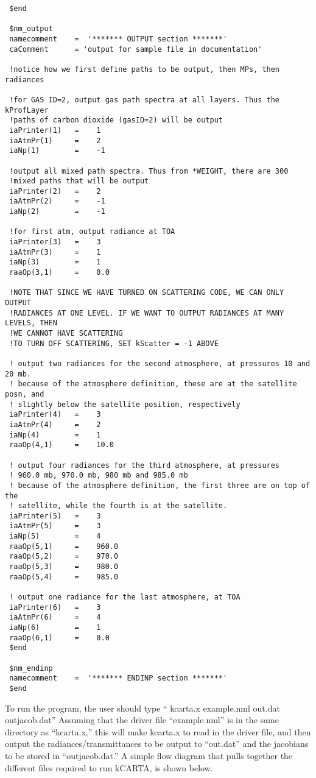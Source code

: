 \documentclass[12pt]{article}
\newcommand{\kc}{\textsf{kCARTA}\xspace}
\begin{document}
\begin{scriptsize}
\begin{verbatim}
 $end

 $nm_output
 namecomment    =  '******* OUTPUT section *******'
 caComment      = 'output for sample file in documentation'

 !notice how we first define paths to be output, then MPs, then radiances

 !for GAS ID=2, output gas path spectra at all layers. Thus the kProfLayer 
 !paths of carbon dioxide (gasID=2) will be output
 iaPrinter(1)   =    1
 iaAtmPr(1)     =    2
 iaNp(1)        =    -1

 !output all mixed path spectra. Thus from *WEIGHT, there are 300 
 !mixed paths that will be output
 iaPrinter(2)   =    2
 iaAtmPr(2)     =    -1
 iaNp(2)        =    -1

 !for first atm, output radiance at TOA
 iaPrinter(3)   =    3
 iaAtmPr(3)     =    1
 iaNp(3)        =    1
 raaOp(3,1)     =    0.0

 !NOTE THAT SINCE WE HAVE TURNED ON SCATTERING CODE, WE CAN ONLY OUTPUT
 !RADIANCES AT ONE LEVEL. IF WE WANT TO OUTPUT RADIANCES AT MANY LEVELS, THEN
 !WE CANNOT HAVE SCATTERING
 !TO TURN OFF SCATTERING, SET kScatter = -1 ABOVE

 ! output two radiances for the second atmosphere, at pressures 10 and 20 mb.
 ! because of the atmosphere definition, these are at the satellite posn, and 
 ! slightly below the satellite position, respectively
 iaPrinter(4)   =    3
 iaAtmPr(4)     =    2
 iaNp(4)        =    1
 raaOp(4,1)     =    10.0

 ! output four radiances for the third atmosphere, at pressures
 ! 960.0 mb, 970.0 mb, 980 mb and 985.0 mb
 ! because of the atmosphere definition, the first three are on top of the 
 ! satellite, while the fourth is at the satellite.
 iaPrinter(5)   =    3
 iaAtmPr(5)     =    3
 iaNp(5)        =    4
 raaOp(5,1)     =    960.0
 raaOp(5,2)     =    970.0
 raaOp(5,3)     =    980.0
 raaOp(5,4)     =    985.0

 ! output one radiance for the last atmosphere, at TOA
 iaPrinter(6)   =    3
 iaAtmPr(6)     =    4
 iaNp(6)        =    1
 raaOp(6,1)     =    0.0
 $end

 $nm_endinp
 namecomment    =  '******* ENDINP section *******'
 $end

\end{verbatim}
\end{scriptsize}

To run the program, the user should type 
     `` kcarta.x example.nml out.dat outjacob.dat''
Assuming that the driver file ``example.nml'' is in the same
directory as ``kcarta.x,'' this will make kcarta.x to read in the
driver file, and then output the radiances/transmittances to be
output to ``out.dat'' and the jacobians to be stored in ``outjacob.dat.''
A simple flow diagram that pulls together the different files required to
run \kc, is shown below.
\end{document}
